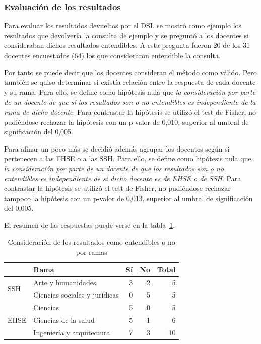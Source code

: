 \subsubsection*{Evaluación de los resultados}

Para evaluar los resultados devueltos por el DSL se mostró como ejemplo los resultados que devolvería la consulta de ejemplo y se preguntó a los docentes si consideraban dichos resultados entendibles. A esta pregunta fueron 20 de los 31 docentes encuestados (64\percentage) los que consideraron entendible la consulta.

Por tanto se puede decir que los docentes consideran el método como válido. Pero también se quiso determinar si existía relación entre la respuesta de cada docente y su rama. Para ello, se define como hipótesis nula que \emph{la consideración por parte de un docente de que si los resultados son o no entendibles es independiente de la rama de dicho docente}. Para contrastar la hipótesis se utilizó el test de Fisher, no pudiéndose rechazar la hipótesis con un p-valor de 0,010, superior al umbral de significación del 0,005.

Para afinar un poco más se decidió además agrupar los docentes según si pertenecen a las EHSE o a  las SSH. Para ello, se define como hipótesis nula que \emph{la consideración por parte de un docente de que los resultados son o no entendibles es independiente de si dicho docente es de EHSE o de SSH}. Para contrastar la hipótesis se utilizó el test de Fisher, no pudiéndose rechazar tampoco la hipótesis con un p-valor de 0,013, superior al umbral de significación del 0,005.

El resumen de las respuestas puede verse en la tabla~\ref{tab:cap:encuesta:resultados:rama}.

\begin{table}
  \begin{center}
  \begin{tabular}{| l | l | r | r | r |}
    \hline
    & Rama & Sí & No & Total \\
    \hline
    \hline
    \multirow{2}{2.5cm}{SSH} & Arte y humanidades & 3 & 2 & 5  \\
    \cline{2-5}
    & Ciencias sociales y jurídicas & 0 & 5 & 5  \\
    \hline
    \multirow{3}{2.5cm}{EHSE} & Ciencias & 5 & 0 & 5  \\
    \cline{2-5}
    & Ciencias de la salud & 5 & 1 & 6  \\
    \cline{2-5}
    & Ingeniería y arquitectura & 7 & 3 & 10 \\
    \hline
  \end{tabular}
\end{center}
\caption{Consideración de los resultados como entendibles o no por ramas}
\label{tab:cap:encuesta:resultados:rama}
\end{table}


